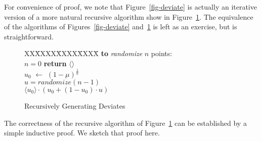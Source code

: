 \documentclass[12pt]{article}
\newcommand{\asgn}{\,\,\leftarrow\,\,}
\begin{document}
  For convenience of proof, we note that
  Figure~\ref{fig-deviate} is actually an iterative version
  of a more natural recursive algorithm show in
  Figure~\ref{fig-recurse}.  The equivalence of the
  algorithms of Figures~\ref{fig-deviate}
  and~\ref{fig-recurse} is left as an exercise, but is straightforward.

  \begin{figure}
    \centering
    \begin{minipage}{0.6\textwidth}
      \begin{tabbing}
      XX\=XXXX\=XXXX\=XXXX\=\kill
      {\bf to} {\it randomize} $n$ points: \\
       $n = 0$ {\bf return} $\langle \rangle$ \\
      \>$u_0 \asgn (1-\mu)^{\frac{1}{n}}$ \\
      \>$u = \textit{randomize} (n - 1)$ \\
       $\langle u_0\rangle \cdot \left(u_0 + (1 - u_0) \cdot u \right)$
    \end{tabbing}
    \end{minipage}
    \caption{Recursively Generating Deviates}\label{fig-recurse}
  \end{figure}

  The correctness of the recursive algorithm of
  Figure~\ref{fig-recurse} can be established by a simple
  inductive proof.  We sketch that proof here.
\end{document}

